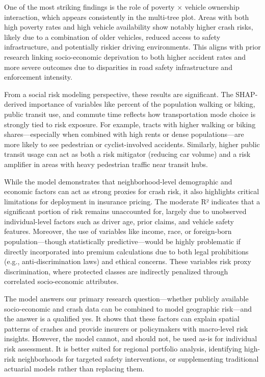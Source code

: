 \documentclass[
  number,
  review,
  3p]{elsarticle}
\begin{document}
One of the most striking findings is the role of poverty × vehicle
ownership interaction, which appears consistently in the multi-tree
plot. Areas with both high poverty rates and high vehicle availability
show notably higher crash risks, likely due to a combination of older
vehicles, reduced access to safety infrastructure, and potentially
riskier driving environments. This aligns with prior research linking
socio-economic deprivation to both higher accident rates and more severe
outcomes due to disparities in road safety infrastructure and
enforcement intensity.

From a social risk modeling perspective, these results are significant.
The SHAP-derived importance of variables like percent of the population
walking or biking, public transit use, and commute time reflects how
transportation mode choice is strongly tied to risk exposure. For
example, tracts with higher walking or biking shares---especially when
combined with high rents or dense populations---are more likely to see
pedestrian or cyclist-involved accidents. Similarly, higher public
transit usage can act as both a risk mitigator (reducing car volume) and
a risk amplifier in areas with heavy pedestrian traffic near transit
hubs.

While the model demonstrates that neighborhood-level demographic and
economic factors can act as strong proxies for crash risk, it also
highlights critical limitations for deployment in insurance pricing. The
moderate R² indicates that a significant portion of risk remains
unaccounted for, largely due to unobserved individual-level factors such
as driver age, prior claims, and vehicle safety features. Moreover, the
use of variables like income, race, or foreign-born population---though
statistically predictive---would be highly problematic if directly
incorporated into premium calculations due to both legal prohibitions
(e.g., anti-discrimination laws) and ethical concerns. These variables
risk proxy discrimination, where protected classes are indirectly
penalized through correlated socio-economic attributes.

The model answers our primary research question---whether publicly
available socio-economic and crash data can be combined to model
geographic risk---and the answer is a qualified yes. It shows that these
factors can explain spatial patterns of crashes and provide insurers or
policymakers with macro-level risk insights. However, the model cannot,
and should not, be used as-is for individual risk assessment. It is
better suited for regional portfolio analysis, identifying high-risk
neighborhoods for targeted safety interventions, or supplementing
traditional actuarial models rather than replacing them.
\end{document}
